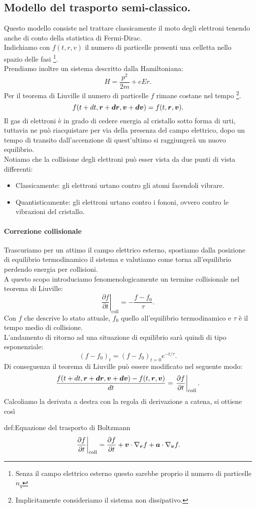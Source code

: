 \subsection{Modello del trasporto semi-classico.}
\label{subsubsec:Modello del trasporto semi-classico.}
Questo modello consiste nel trattare classicamente il moto degli elettroni tenendo anche di conto della statistica di Fermi-Dirac.\\
Indichiamo con $f( t, r, v) $ il numero di particelle presenti una celletta nello spazio delle fasi \footnote{Senza il campo elettrico esterno questo sarebbe proprio il numero di particelle $n_q$}.\\
Prendiamo inoltre un sistema descritto dalla Hamiltoniana:
\[
	H = \frac{p^2}{2m} + eEr
.\] 
Per il teorema di Liuville il numero di particelle $f$ rimane costane nel tempo \footnote{Implicitamente consideriamo il sistema non dissipativo.}.
\[
	f( t+dt,\boldsymbol{r}+\boldsymbol{dr}, \boldsymbol{v}+\boldsymbol{dv})
	= 
	f( t, \boldsymbol{r}, \boldsymbol{v}) 
.\] 
Il gas di elettroni è in grado di cedere energia al cristallo sotto forma di urti, tuttavia ne può riacquistare per via della presenza del campo elettrico, dopo un tempo di transito dall'accenzione di quest'ultimo si raggiungerà un nuovo equilibrio.\\
Notiamo che la collisione degli elettroni può esser vista da due punti di vista differenti:
\begin{itemize}
	\item Classicamente: gli elettroni urtano contro gli atomi facendoli vibrare.
	\item Quantisticamente: gli elettroni urtano contro i fononi, ovvero contro le
		vibrazioni del cristallo.
\end{itemize}
\paragraph{Correzione collisionale}
Trascuriamo per un attimo il campo elettrico esterno, spostiamo dalla posizione di equilibrio termodinamico il sistema e valutiamo come torna all'equilibrio perdendo energia per collisioni.\\
A questo scopo introduciamo fenomenologicamente un termine collisionale nel teorema di Liuville:
\[
	\left.\frac{\partial f}{\partial t} \right|_{\text{coll}} 
		=
	- \frac{f-f_0}{\tau }
.\] 
Con $f$ che descrive lo stato attuale, $f_0$ quello all'equilibrio termodinamico e $\tau $ è il tempo medio di collisione.\\
L'andamento di ritorno ad una situazione di equilibrio sarà quindi di tipo esponenziale:
\[
	\left( f-f_0 \right)_t = \left( f-f_0 \right)_{t=0} e^{-t /\tau }
.\] 
Di conseguenza il teorema di Liuville può essere modificato nel seguente modo:
\[
	\frac{f( t+dt,\boldsymbol{r}+\boldsymbol{dr}, \boldsymbol{v}+\boldsymbol{dv}) - f( t,\boldsymbol{r},\boldsymbol{v}) }{dt}
	=
	\left.\frac{\partial f}{\partial t} \right|_{\text{coll}}
.\] 
Calcoliamo la derivata a destra con la regola di derivazione a catena, si ottiene così
\begin{defn}{def:Equazione del trasporto di Boltzmann}
	\[
	\left.\frac{\partial f}{\partial t} \right|_{\text{coll}}
		=
	\frac{\partial f}{\partial t} 
	+ \boldsymbol{v}\cdot\nabla_{\boldsymbol{r}} f 
	+ \boldsymbol{a} \cdot \nabla _{\boldsymbol{v}} f  
	.\]
\end{defn}
